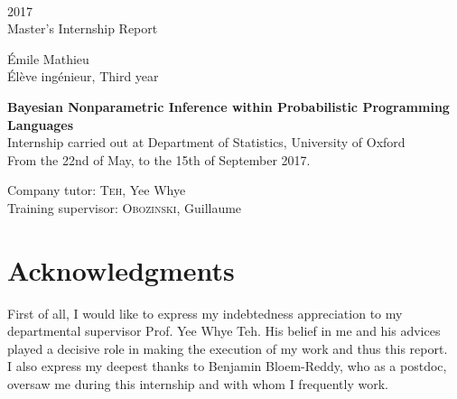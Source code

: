\documentclass[twoside,10pt,openany,a4paper]{rapport}
\begin{document}
\begin{titlepage}
\begin{center}
      
      \vspace{0.3cm}
      \\
      
      \vspace{0.7cm}
      2017\\
      Master's Internship Report
      
      \vspace{0.3cm}
      Émile Mathieu\\
      Élève ingénieur, Third year
      
      \vspace{2cm}
      \Huge{\textbf{Bayesian Nonparametric Inference within Probabilistic Programming Languages}}\\

      
      \vfill
      \normalsize{}
      Internship carried out at Department of Statistics, University of Oxford \\
      From the 22nd of May, to the 15th of September 2017.
      
      \vspace{0.3cm}
       Company tutor: \textsc{Teh}, Yee Whye\\
       Training supervisor: \textsc{Obozinski}, Guillaume

      \end{center}
\end{titlepage}

\cleardoublepage


\chapter{Acknowledgments}

First of all, I would like to express my indebtedness appreciation to my departmental supervisor Prof. Yee Whye Teh. His belief in me and his advices played a decisive role in making the execution of my work and thus this report. \\

I also express my deepest thanks to Benjamin Bloem-Reddy, who as a postdoc, oversaw me during this internship and with whom I frequently work. \\
\end{document}
